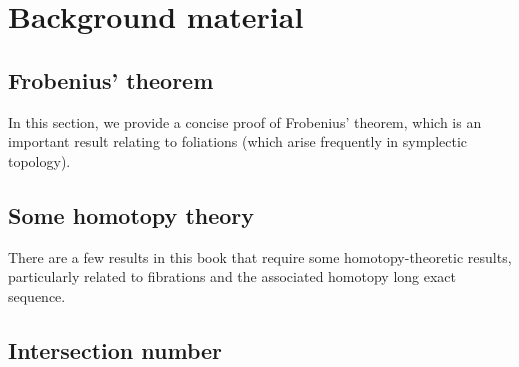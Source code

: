 \documentclass[aps,pra,showpacs,notitlepage,onecolumn,superscriptaddress,nofootinbib]{revtex4-1}
\theoremstyle{definition}
\begin{document}
\section{Background material}

\subsection{Frobenius' theorem}

\noindent In this section, we provide a concise proof of Frobenius' theorem, which is an important result relating to foliations (which arise frequently in symplectic topology).

\subsection{Some homotopy theory}

\noindent There are a few results in this book that require some homotopy-theoretic results, particularly related to fibrations and the associated homotopy long exact sequence.

\subsection{Intersection number}


\end{document}
